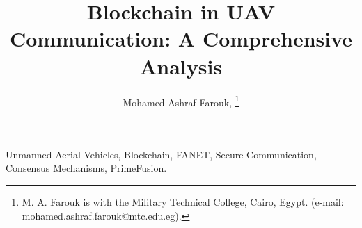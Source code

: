 \documentclass[journal]{IEEEtran}
\begin{document}
\title{Blockchain in UAV Communication: A Comprehensive Analysis}

\author{Mohamed Ashraf Farouk, 
\thanks{M. A. Farouk is with the Military Technical College, Cairo, Egypt.
(e-mail: mohamed.ashraf.farouk@mtc.edu.eg).}} %

\maketitle



\begin{IEEEkeywords}
Unmanned Aerial Vehicles, Blockchain, FANET, Secure Communication, Consensus Mechanisms, PrimeFusion.
\end{IEEEkeywords}























\end{document}
